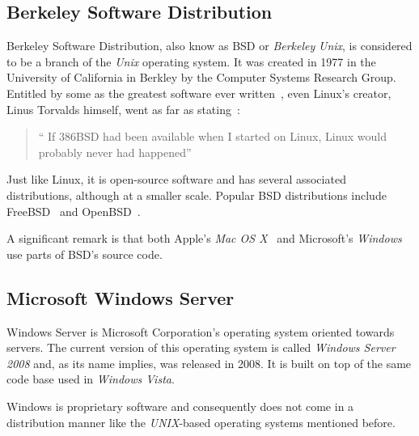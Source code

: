 \subsection{Berkeley Software Distribution}
Berkeley Software Distribution, also know as BSD or \textit{Berkeley} \textit{Unix}, is considered to be a branch of the \textit{Unix} operating system. It was created in 1977 in the University of California in Berkley by the Computer Systems Research Group.  Entitled by some as the greatest software ever written~\cite{ greatest_software_ever_written}, even Linux's creator, Linus Torvalds himself, went as far as stating~\cite{ interview_linus}: 
\begin{quote}
  `` If 386BSD had been available when I started on Linux, Linux would probably never had happened''
\end{quote}
Just like Linux, it is open-source software and has several associated distributions, although at a smaller scale. Popular BSD distributions include FreeBSD~\cite{freebsd} and OpenBSD~\cite{openbsd}.

A significant remark is that both Apple's \textit{Mac OS X}~\cite{leopard_os_foundations} and Microsoft's \textit{Windows}~\cite{ bsd_code_windows} use parts of BSD's source code.

\subsection{Microsoft Windows Server}
Windows Server is Microsoft Corporation's operating system oriented towards servers. The current version of this operating system is called \textit{Windows Server 2008} and, as its name implies, was released in 2008. It is built on top of the same code base used in \textit{Windows Vista}.

Windows is proprietary software and consequently does not come in a distribution manner like the \textit{UNIX}-based operating systems mentioned before.
